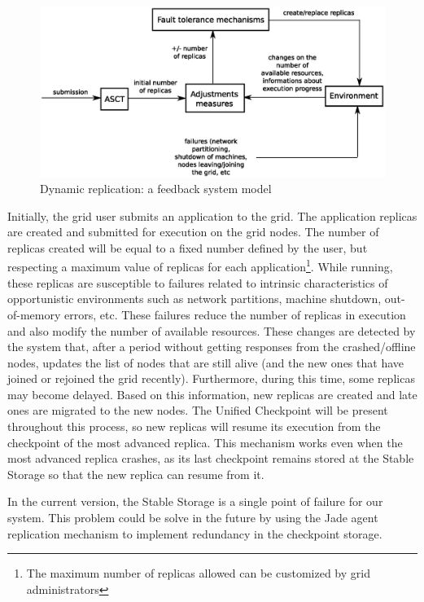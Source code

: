 \documentclass[times, 09pt, twocolumn]{article}
\begin{document}
\begin{figure}[th]
\centering \includegraphics[width=1.1\columnwidth]{feedback.eps}
\caption{Dynamic replication: a feedback system model}
\label{fig:feedback}
\end{figure}
%
Initially, the grid user submits an application to the grid. The application
replicas are created and submitted for execution on the grid nodes. The number of
replicas created will be equal to a fixed number defined by the user, but
respecting a maximum value of replicas for each application\footnote{The
maximum number of replicas allowed can be customized by grid
administrators}. While running, these replicas are susceptible to failures
related to intrinsic characteristics of opportunistic environments such as
network partitions, machine shutdown, out-of-memory errors, etc. These
failures reduce the number of replicas in execution and also modify the number
of available resources. These changes are detected by the system that, after a
period without getting responses from the crashed/offline nodes, updates the
list of nodes that are still alive (and the new ones that have joined or
rejoined the grid recently). Furthermore, during this time, some
replicas may become delayed. Based on this information, new replicas are
created and late ones are migrated to the new nodes. 
The Unified Checkpoint will be present throughout this process, so new replicas will resume its execution
from the checkpoint of the most advanced replica. This mechanism works even
when the most advanced replica crashes, as its last checkpoint remains stored
at the Stable Storage so that the new replica can resume from it.

In the current version, the Stable Storage is a single point of failure for our
system. This problem could be solve in the future by using the Jade agent
replication mechanism to implement redundancy in the checkpoint storage.
\end{document}
